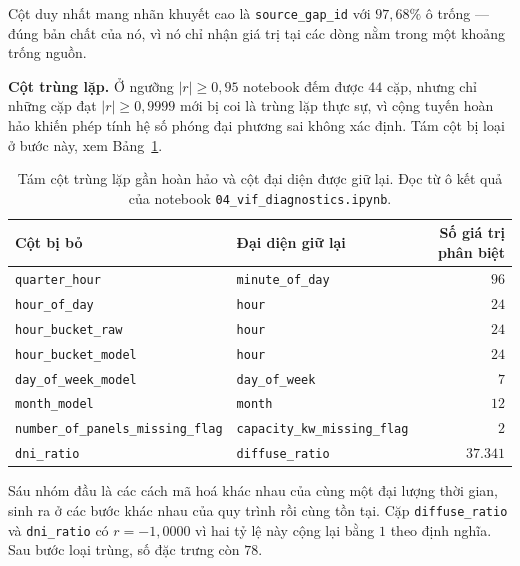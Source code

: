 \documentclass[12pt, a4paper]{report}
\begin{document}
Cột duy nhất mang nhãn khuyết cao là \texttt{source\_gap\_id} với $97{,}68\%$ ô trống --- đúng bản
chất của nó, vì nó chỉ nhận giá trị tại các dòng nằm trong một khoảng trống nguồn.

\textbf{Cột trùng lặp.} Ở ngưỡng $|r| \ge 0{,}95$ notebook đếm được $44$ cặp, nhưng chỉ những
cặp đạt $|r| \ge 0{,}9999$ mới bị coi là trùng lặp thực sự, vì cộng tuyến hoàn hảo khiến phép
tính hệ số phóng đại phương sai không xác định. Tám cột bị loại ở bước này, xem
Bảng~\ref{tab:trung_lap}.

\begin{table}[htbp]
\centering
\caption{Tám cột trùng lặp gần hoàn hảo và cột đại diện được giữ lại. Đọc từ ô kết quả của
notebook \texttt{04\_vif\_diagnostics.ipynb}.}
\label{tab:trung_lap}
\footnotesize
\begin{tabular}{l l r}
\toprule
\textbf{Cột bị bỏ} & \textbf{Đại diện giữ lại} & \textbf{Số giá trị phân biệt} \\
\midrule
\texttt{quarter\_hour}                  & \texttt{minute\_of\_day}            & $96$ \\
\texttt{hour\_of\_day}                  & \texttt{hour}                       & $24$ \\
\texttt{hour\_bucket\_raw}              & \texttt{hour}                       & $24$ \\
\texttt{hour\_bucket\_model}            & \texttt{hour}                       & $24$ \\
\texttt{day\_of\_week\_model}           & \texttt{day\_of\_week}              & $7$ \\
\texttt{month\_model}                   & \texttt{month}                      & $12$ \\
\texttt{number\_of\_panels\_missing\_flag} & \texttt{capacity\_kw\_missing\_flag} & $2$ \\
\texttt{dni\_ratio}                     & \texttt{diffuse\_ratio}             & $37.341$ \\
\bottomrule
\end{tabular}
\end{table}

Sáu nhóm đầu là các cách mã hoá khác nhau của cùng một đại lượng thời gian, sinh ra ở các bước
khác nhau của quy trình rồi cùng tồn tại. Cặp \texttt{diffuse\_ratio} và \texttt{dni\_ratio} có
$r = -1{,}0000$ vì hai tỷ lệ này cộng lại bằng $1$ theo định nghĩa. Sau bước loại trùng, số đặc
trưng còn $78$.
\end{document}
